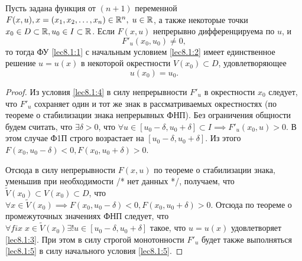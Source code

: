 \documentclass[../../main.tex]{subfiles}
\begin{document}
	 \begin{thm}
		Пусть задана функция от $(n+1)$ переменной $F(x, u), x = (x_1, x_2, \ldots,
	 	x_n) \in \mathbb{R}^n, \; u \in \mathbb{R}$, а также некоторые точки $x_0 \in D \subset \mathbb{R}, u_0
		\in I \subset \mathbb{R}$. Если $F(x,u)$ непрерывно дифференцируема по $u$, и 
		\begin{equation}
			F'_u(x_0, u_0) \ne 0, \label{lec8.1:4}
		\end{equation}
		то тогда ФУ \eqref{lec8.1:1} с начальным условием \eqref{lec8.1:2} имеет 
		единственное решение $u = u(x)$ в некоторой окрестности $V(x_0) \subset D$,
		удовлетворяющее
	 	\begin{equation}
			u(x_0) = u_0. \label{lec8.1:5}
		\end{equation}
	 \end{thm}
	 \begin{proof}
		Из условия \eqref{lec8.1:4} в силу непрерывности $F'_u$ в окрестности $x_0$
		следует, что $F'_u$ сохраняет один и тот же знак в рассматриваемых 
		окрестностях (по теореме о стабилизации знака непрерывных ФНП). Без 
		ограничения общности будем считать, что $\exists \delta > 0$, что $\forall u \in
		[u_0 - \delta, u_0 + \delta] \subset I \implies F'_u(x_0, u)>0$. В этом случае Ф1П
		 строго возрастает на $[u_0 - \delta, u_0 + \delta]$. Из этого $F(x_0, u_0 - 
		 \delta) < 0, F(x_0, u_0 + \delta) > 0$.

		 Отсюда в силу непрерывности
		 $F(x,u)$ по теореме о стабилизации  знака, уменьшив при необходимости
		 /* нет данных */, получаем, что $\widetilde V(x_0) \subset V(x_0) \subset D$, 
		 что $\forall x \in \widetilde V(x_0) \implies F(x_0, u_0 - \delta) < 0, F(x_0, u_0 + 
		 \delta) > 0$. Отсюда по теореме о промежуточных значениях ФНП следует,
		 что $\forall fix \; x \in \widetilde V(x_0) \exists! u \in [u_0 - \delta, u_0 + \delta]$ 
		 такое, что $u = u(x)$ удовлетворяет \eqref{lec8.1:3}. При этом в силу строгой 
		 монотонности $F'_u$ будет также выполняться \eqref{lec8.1:5} в силу 
		 начального условия \eqref{lec8.1:5}. 
	 \end{proof}
\end{document}
